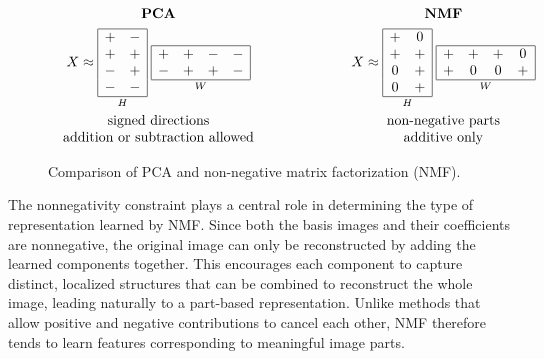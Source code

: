 \documentclass[11pt,a4paper]{article}
\begin{document}
\begin{figure}[h]
	\centering
	\setlength{\abovecaptionskip}{2pt}
	\[
	\begin{array}{c@{\qquad}c}
	\begin{array}{c}
	\textbf{PCA}\\[4pt]
	X\approx
	\underset{H}{
		\begin{array}{|cc|}
		\hline
		+&-\\
		+&+\\
		-&+\\
		-&-\\
		\hline
		\end{array}}
	\;
	\underset{W}{
		\begin{array}{|cccc|}
		\hline
		+&+&-&-\\
		-&+&+&-\\
		\hline
		\end{array}}
	\\[8pt]
	\\[-8pt]
	\text{signed directions}\\
	\text{addition or subtraction allowed}
	\end{array}
	&
	\qquad \qquad
	\begin{array}{c}
	\textbf{NMF}\\[4pt]
	X\approx
	\underset{H}{
		\begin{array}{|cc|}
		\hline
		+&0\\
		+&+\\
		0&+\\
		0&+\\
		\hline
		\end{array}}
	\;
	\underset{W}{
		\begin{array}{|cccc|}
		\hline
		+&+&+&0\\
		+&0&0&+\\
		\hline
		\end{array}}
	\\[8pt]
	\\[-8pt]
	\text{non-negative parts}\\
	\text{additive only}
	\end{array}
	\end{array}
	\]
	\caption{Comparison of PCA and non-negative matrix factorization (NMF).}
	\label{fig:pca_vs_nmf_schematic}
\end{figure}

The nonnegativity constraint plays a central role in determining the type of representation learned by NMF. Since both the basis images and their coefficients are nonnegative, the original image can only be reconstructed by adding the learned components together. This encourages each component to capture distinct, localized structures that can be combined to reconstruct the whole image, leading naturally to a part-based representation. Unlike methods that allow positive and negative contributions to cancel each other, NMF therefore tends to learn features corresponding to meaningful image parts.
\end{document}
